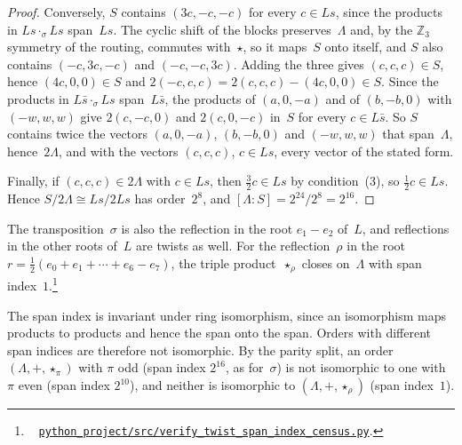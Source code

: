 \documentclass[twoside,english]{paper}
\numberwithin{equation}{section}
\numberwithin{figure}{section}
\theoremstyle{definition}
\theoremstyle{remark}
\newcommand{\ZZ}{\mathbb{Z}}
\newcommand{\LL}{\Lambda}             %
\newcommand{\scriptref}[1]{\cite{repo}~%
  \href{https://github.com/koeplinger/leech\_alg/blob/main/python\_project/src/#1}%
  {\nolinkurl{python_project/src/#1}}}
\begin{document}
\begin{proof}
Conversely, $S$ contains $(3c, -c, -c)$ for every $c \in Ls$, since the
products in $Ls \cdot_\sigma Ls$ span~$Ls$.  The cyclic shift of the
blocks preserves~$\LL$ and, by the $\ZZ_3$ symmetry of the routing,
commutes with~$\star$, so it maps~$S$ onto itself, and $S$ also contains
$(-c, 3c, -c)$ and $(-c, -c, 3c)$.  Adding the three gives $(c, c, c) \in
S$, hence $(4c, 0, 0) \in S$ and $2(-c, c, c) = 2(c, c, c) - (4c, 0, 0)
\in S$.  Since the products in $L\bar s \cdot_\sigma Ls$ span~$L\bar s$,
the products of $(a, 0, -a)$ and of $(b, -b, 0)$ with $(-w, w, w)$ give
$2(c, -c, 0)$ and $2(c, 0, -c)$ in~$S$ for every $c \in L\bar s$.  So $S$
contains twice the vectors $(a, 0, -a)$, $(b, -b, 0)$ and $(-w, w, w)$
that span~$\LL$, hence~$2\LL$, and with the vectors $(c, c, c)$, $c \in
Ls$, every vector of the stated form.

Finally, if $(c, c, c) \in 2\LL$ with $c \in Ls$, then $\tfrac32 c \in
Ls$ by condition~(3), so $\tfrac12 c \in Ls$.  Hence $S/2\LL \cong
Ls/2Ls$ has order~$2^8$, and $[\LL : S] = 2^{24}/2^8 = 2^{16}$.
\end{proof}

The transposition~$\sigma$ is also the reflection in the root
$e_1 - e_2$ of~$L$, and reflections in the other roots of~$L$ are
twists as well.  For the reflection~$\rho$ in the root
$r = \tfrac12(e_0 + e_1 + \cdots + e_6 - e_7)$, the triple
product~$\star_\rho$ closes on~$\LL$ with span
index~$1$.\footnote{\scriptref{verify\_twist\_span\_index\_census.py}.}

The span index is invariant under ring isomorphism, since an
isomorphism maps products to products and hence the span onto the
span.  Orders with different span indices are therefore not
isomorphic.  By the parity split, an order $(\LL, +, \star_\pi)$ with
$\pi$ odd (span index $2^{16}$, as for~$\sigma$) is not isomorphic
to one with $\pi$ even (span index $2^{10}$), and neither is
isomorphic to $(\LL, +, \star_\rho)$ (span index~$1$).

\end{document}
